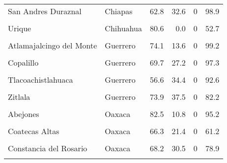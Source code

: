 \documentclass[
]{report}
\begin{document}
\begin{longtable}[t]{llrrrr}
San Andres Duraznal & Chiapas & 62.8 & 32.6 & 0 & 98.9\\
\cellcolor{gray!6}{Santiago El Pinar} & \cellcolor{gray!6}{Chiapas} & \cellcolor{gray!6}{53.8} & \cellcolor{gray!6}{35.2} & \cellcolor{gray!6}{0} & \cellcolor{gray!6}{99.7}\\
Urique & Chihuahua & 80.6 & 0.0 & 0 & 52.7\\
\addlinespace
\cellcolor{gray!6}{Ahuacuotzingo} & \cellcolor{gray!6}{Guerrero} & \cellcolor{gray!6}{73.3} & \cellcolor{gray!6}{28.7} & \cellcolor{gray!6}{0} & \cellcolor{gray!6}{50.9}\\
Atlamajalcingo del Monte & Guerrero & 74.1 & 13.6 & 0 & 99.2\\
\cellcolor{gray!6}{Atlixtac} & \cellcolor{gray!6}{Guerrero} & \cellcolor{gray!6}{62.5} & \cellcolor{gray!6}{35.2} & \cellcolor{gray!6}{0} & \cellcolor{gray!6}{75.5}\\
Copalillo & Guerrero & 69.7 & 27.2 & 0 & 97.3\\
\cellcolor{gray!6}{Copanatoyac} & \cellcolor{gray!6}{Guerrero} & \cellcolor{gray!6}{62.4} & \cellcolor{gray!6}{30.3} & \cellcolor{gray!6}{0} & \cellcolor{gray!6}{97.4}\\
\addlinespace
Tlacoachistlahuaca & Guerrero & 56.6 & 34.4 & 0 & 92.6\\
\cellcolor{gray!6}{Xalpatlahuac} & \cellcolor{gray!6}{Guerrero} & \cellcolor{gray!6}{68.4} & \cellcolor{gray!6}{23.4} & \cellcolor{gray!6}{0} & \cellcolor{gray!6}{97.9}\\
Zitlala & Guerrero & 73.9 & 37.5 & 0 & 82.2\\
\cellcolor{gray!6}{Mezquitic} & \cellcolor{gray!6}{Jalisco} & \cellcolor{gray!6}{74.1} & \cellcolor{gray!6}{24.5} & \cellcolor{gray!6}{0} & \cellcolor{gray!6}{83.5}\\
Abejones & Oaxaca & 82.5 & 10.8 & 0 & 95.2\\
\addlinespace
\cellcolor{gray!6}{Calihuala} & \cellcolor{gray!6}{Oaxaca} & \cellcolor{gray!6}{74.9} & \cellcolor{gray!6}{24.1} & \cellcolor{gray!6}{0} & \cellcolor{gray!6}{61.5}\\
Coatecas Altas & Oaxaca & 66.3 & 21.4 & 0 & 61.2\\
\cellcolor{gray!6}{Coicoyan de las Flores} & \cellcolor{gray!6}{Oaxaca} & \cellcolor{gray!6}{42.9} & \cellcolor{gray!6}{16.3} & \cellcolor{gray!6}{0} & \cellcolor{gray!6}{99.1}\\
Constancia del Rosario & Oaxaca & 68.2 & 30.5 & 0 & 78.9\\
\cellcolor{gray!6}{Eloxochitlan de Flores Magon} & \cellcolor{gray!6}{Oaxaca} & \cellcolor{gray!6}{66.0} & \cellcolor{gray!6}{39.9} & \cellcolor{gray!6}{0} & \cellcolor{gray!6}{98.4}\\

\end{longtable}
\end{document}
